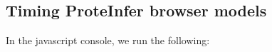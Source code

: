 \subsection*{Timing ProteInfer browser models}
\DIFdelbegin %
\DIFdelend In the javascript console, we run the following:
\DIFdelbegin %
